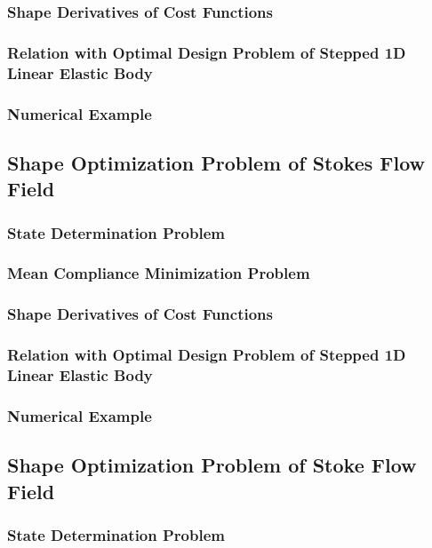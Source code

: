 \documentclass[oneside]{book}
\numberwithin{equation}{section}
\begin{document}
\subsubsection{Shape Derivatives of Cost Functions}

\subsubsection{Relation with Optimal Design Problem of Stepped 1D Linear Elastic Body}

\subsubsection{Numerical Example}

\subsection{Shape Optimization Problem of Stokes Flow Field}

\subsubsection{State Determination Problem}

\subsubsection{Mean Compliance Minimization Problem}

\subsubsection{Shape Derivatives of Cost Functions}

\subsubsection{Relation with Optimal Design Problem of Stepped 1D Linear Elastic Body}

\subsubsection{Numerical Example}

\subsection{Shape Optimization Problem of Stoke Flow Field}

\subsubsection{State Determination Problem}
\end{document}
